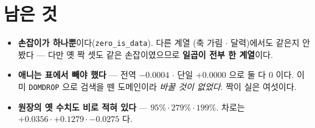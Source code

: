 \documentclass[11pt]{article}
\begin{document}
\section*{남은 것}

\begin{itemize}
\item \textbf{손잡이가 하나뿐}이다(\texttt{zero\_is\_data}). 다른 계열
(축 가림 $\cdot$ 달력)에서도 같은지 안 봤다 --- 다만 옛 짝 셋도 같은
손잡이였으므로 \textbf{일곱이 전부 한 계열}이다.
\item \textbf{애니는 표에서 빼야 했다} --- 전역 $-0.0004$ $\cdot$ 단일
$+0.0000$ 으로 둘 다 $0$ 이다. 이미 \texttt{DOMDROP} 으로 검색을 뗀
도메인이라 \emph{바꿀 것이 없었다}. 짝이 실은 여섯이다.
\item \textbf{원장의 옛 수치도 비로 적혀 있다} --- $95\% \cdot 279\% \cdot
199\%$. 차로는 $+0.0356 \cdot +0.1279 \cdot -0.0275$ 다.
\end{itemize}
\end{document}
